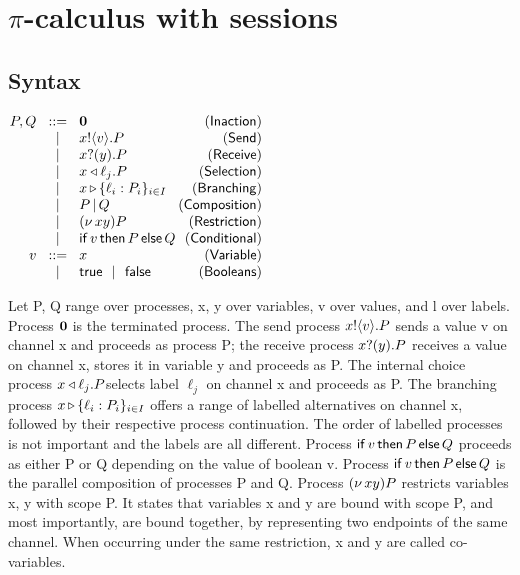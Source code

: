 
\section{$\pi$-calculus with sessions}

\subsection{Syntax}

\begin{definition}

$
	\arraycolsep=1pt
	\begin{array}{rclr}
		P, Q &\bnfis& \nil & \Inact
		\\
		&\bnfbar& \pout{x}{v} P & \Send
    \\
    &\bnfbar& \pin{x}{y} P & \Rcv
    \\
		& \bnfbar & \sel{x}{\ell_j} P & \Selection
    \\
    &\bnfbar& \branch{x}{\ell_i: P_i}_{i \in I} & \Branching
    \\
    &\bnfbar& P\pll Q & \Composition
		\\
    &\bnfbar& \newn{xy} P& \Restriction
		\\
    &\bnfbar& \cond{v}{P}{Q}& \Conditional
    \\
    v &\bnfis& x & \Variable
    \\
    &\bnfbar& \true \bnfbar \false & \Booleans
	\end{array}
$
\end{definition}
Let P, Q range over processes, x, y over variables, v over values, and l over labels. Process $\mathbf{0}$ is the terminated process. The send process $x{}!\langle v\rangle. P$ sends a value v on channel x and proceeds as process P; the receive process ${x}{}?(y). P$ receives a value on channel x, stores it in variable y and proceeds as P. The internal choice process $x\triangleleft \ell_j. P $selects label $\ell_j$ on channel x and proceeds as P. The branching process $x\,{\triangleright}\,\{\ell_i: P_i\}_{i \in I}$ offers a range of labelled alternatives on channel x, followed by their respective process continuation.  The order of labelled processes is not important and the labels are all different. Process $\mathsf{if}\,v\,\mathsf{then}\,P\,\mathsf{else}\,Q$ proceeds as either P or Q depending on the value of boolean v. Process $\mathsf{if}\,v\,\mathsf{then}\,P\,\mathsf{else}\,Q$ is the parallel composition of processes P and Q. Process $(\nu\,xy) P$ restricts variables x, y with scope P. It states that variables x and y are bound with scope P, and most importantly, are bound together, by representing two endpoints of the same channel. When occurring under the same restriction, x and y are called co-variables.
\vspace{-2mm}

